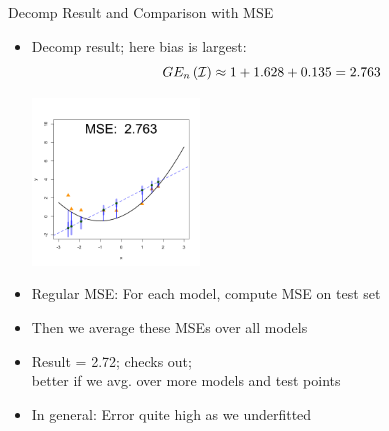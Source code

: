 \documentclass[11pt,compress,t,notes=noshow, xcolor=table]{beamer}
\begin{document}
\begin{vbframe} {Decomp Result and Comparison with MSE}

\begin{footnotesize}
\begin{itemize}
\item Decomp result; here bias is largest:
$$GE_n\left(\mathcal{I}\right) \approx 1 + 1.628 + 0.135 = 2.763 $$
\begin{center}
  \includegraphics[width = 0.35\textwidth]{figure/bias_variance_decomposition-linear_model_mse.png}
\end{center}
\item Regular MSE: For each model, compute MSE on test set
\item Then we average these MSEs over all models
\item Result = 2.72; checks out; \\
better if we avg. over more models and test points 
\item In general: Error quite high as we underfitted
\end{itemize}

\end{footnotesize}

\end{vbframe} 
\end{document}
